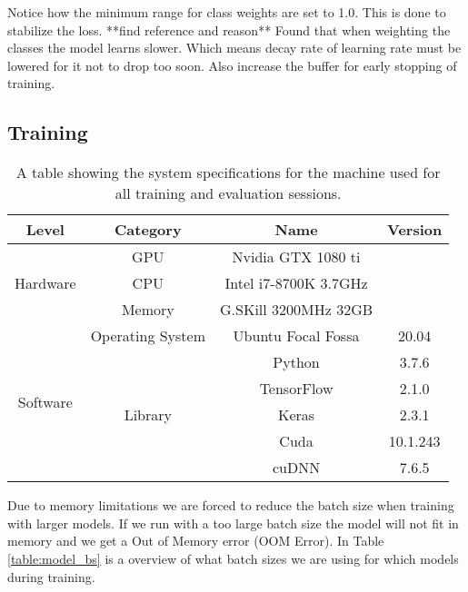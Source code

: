\documentclass[thesis.tex]{subfiles}
\begin{document}
Notice how the minimum range for class weights are set to 1.0. This is done to stabilize the loss. **find reference and reason**
Found that when weighting the classes the model learns slower. Which means decay rate of learning rate must be lowered for it not to drop too soon. Also increase the buffer for early stopping of training.



\subsection{Training}

\begin{table} %
  \centering
  \renewcommand{\arraystretch}{1.3}
  \begin{tabular}{|c|c|c|c|}
  \hline
  Level		& Category		& Name		& Version \\
  \hline
  \multirow{3}{*}{Hardware} & GPU & Nvidia GTX 1080 ti & \\
  \cline{2-4}
  & CPU & Intel i7-8700K 3.7GHz & \\
  \cline{2-4}
  & Memory & G.SKill 3200MHz 32GB & \\
  \hline
  \multirow{6}{*}{Software} & Operating System & Ubuntu Focal Fossa & 20.04 \\
  \cline{2-4}
  & \multirow{5}{*}{Library} & Python & 3.7.6 \\
  \cline{3-4}
  & & TensorFlow & 2.1.0 \\
  \cline{3-4}
  & & Keras & 2.3.1 \\
  \cline{3-4}
  & & Cuda & 10.1.243 \\
  \cline{3-4}
  & & cuDNN & 7.6.5 \\
  \hline
  \end{tabular}
  \caption[System specifications]{A table showing the system specifications for the machine used for all training and evaluation sessions.}
  \label{table:system_specs}
\end{table}

Due to memory limitations we are forced to reduce the batch size when training with larger models. If we run with a too large batch size the model will not fit in memory and we get a Out of Memory error (OOM Error). In Table \ref{table:model_bs} is a overview of what batch sizes we are using for which models during training.
\end{document}
